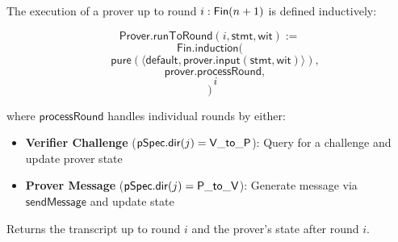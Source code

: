 \begin{definition}
    \label{def:prover_run_to_round}
    The execution of a prover up to round \(i : \mathsf{Fin}(n+1)\) is defined inductively:

    \begin{equation*} \mathsf{Prover}.\mathsf{runToRound}(i, \mathsf{stmt}, \mathsf{wit}) := \end{equation*}
    \begin{equation*} \mathsf{Fin}.\mathsf{induction}( \end{equation*}
    \begin{equation*} \quad \mathsf{pure}(\langle \mathsf{default}, \mathsf{prover}.\mathsf{input}(\mathsf{stmt}, \mathsf{wit}) \rangle), \end{equation*}
    \begin{equation*} \quad \mathsf{prover}.\mathsf{processRound}, \end{equation*}
    \begin{equation*} \quad i \end{equation*}
    \begin{equation*} ) \end{equation*}

    where \(\mathsf{processRound}\) handles individual rounds by either:
    \begin{itemize}
        \item \textbf{Verifier Challenge} (\(\mathsf{pSpec}.\mathsf{dir}(j) = \mathsf{V\_to\_P}\)): Query for a challenge and update prover state
        \item \textbf{Prover Message} (\(\mathsf{pSpec}.\mathsf{dir}(j) = \mathsf{P\_to\_V}\)): Generate message via \(\mathsf{sendMessage}\) and update state
    \end{itemize}

    Returns the transcript up to round \(i\) and the prover's state after round \(i\).
    \leanok
\end{definition}

